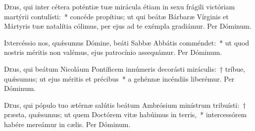 \documentclass[vesperale_romanum.tex]{subfiles}
\begin{document}

\oratio

\lettrine{D}{e}us, qui inter cétera poténtiæ tuæ mirácula étiam in sexu frágili victóriam martýrii contulísti:~* concéde propítius; ut qui beátæ Bárbaræ Vírginis et Mártyris tuæ natalítia cólimus, per ejus ad te exémpla gradiámur. Per Dóminum.


\myrule



\oratio

\lettrine{I}{n}tercéssio nos, quǽsumus Dómine, beáti Sabbæ Abbátis comméndet:~* ut quod nostris méritis non valémus, ejus patrocínio assequámur. Per Dóminum.

\myrule


\duplex

\oratio

\lettrine{D}{e}us, qui beátum Nicoláum Pontíficem innúmeris decorásti miráculis:~† tríbue, quǽsumus; ut ejus méritis et précibus~* a gehénnæ incéndiis liberémur. Per Dóminum.

\myrule


\duplexmtv


\oratio

\lettrine{D}{e}us, qui pópulo tuo ætérnæ salútis beátum Ambrósium minístrum tribuísti:~† præsta, quǽsumus; ut quem Doctórem vitæ habúimus in terris,~* intercessórem habére mereámur in cælis. Per Dóminum.

\end{document}
